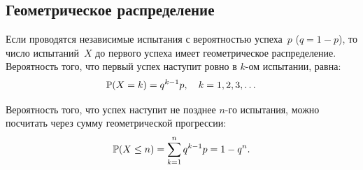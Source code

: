 \subsection{Геометрическое распределение}
Если проводятся независимые испытания с вероятностью успеха~$p$ ($q = 1 - p$), то число испытаний~$X$ до первого успеха имеет геометрическое распределение. Вероятность того, что первый успех наступит ровно в $k$-ом испытании, равна:
\[
\mathbb{P}(X = k) = q^{k-1} p, \quad k = 1, 2, 3, \dots
\]

Вероятность того, что успех наступит не позднее $n$-го испытания, можно посчитать через сумму геометрической прогрессии:
\[
\mathbb{P}(X \le n) = \sum_{k=1}^n q^{k-1} p = 1 - q^n.
\]